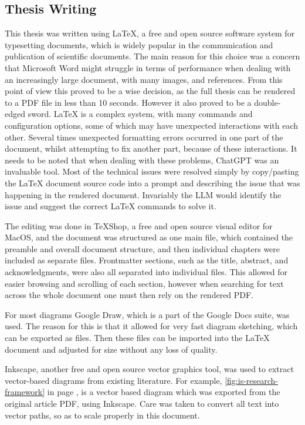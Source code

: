 

\subsection{Thesis Writing}

This thesis was written using LaTeX, a free and open source software system for typesetting documents, which is widely popular in the communication and publication of scientific documents. The main reason for this choice was a concern that Microsoft Word might struggle in terms of performance when dealing with an increasingly large document, with many images, and references. From this point of view this proved to be a wise decision, as the full thesis can be rendered to a PDF file in less than 10 seconds. However it also proved to be a double-edged sword. LaTeX is a complex system, with many commands and configuration options, some of which may have unexpected interactions with each other. Several times unexpected formatting errors occurred in one part of the document, whilst attempting to fix another part, because of these interactions.
It needs to be noted that when dealing with these problems, ChatGPT was an invaluable tool. Most of the technical issues were resolved simply by copy/pasting the LaTeX document source code into a prompt and describing the issue that was happening in the rendered document. Invariably the LLM would identify the issue and suggest the correct LaTeX commands to solve it.

The editing was done in TeXShop, a free and open source visual editor for MacOS, and the document was structured as one main file, which contained the preamble and overall document structure, and then individual chapters were included as separate files. Frontmatter sections, such as the title, abstract, and acknowledgments, were also all separated into individual files. This allowed for easier browsing and scrolling of each section, however when searching for text across the whole document one must then rely on the rendered PDF.

For most diagrams Google Draw, which is a part of the Google Docs suite, was used. The reason for this is that it allowed for very fast diagram sketching, which can be exported as  files. Then these files can be imported into the LaTeX document and adjusted for size without any loss of quality.

Inkscape, another free and open source vector graphics tool, was used to extract vector-based diagrams from existing literature. For example, \autoref{fig:is-research-framework} in page \pageref{fig:is-research-framework}, is a vector based diagram which was exported from the original article PDF, using Inkscape. Care was taken to convert all text into vector paths, so as to scale properly in this document.


